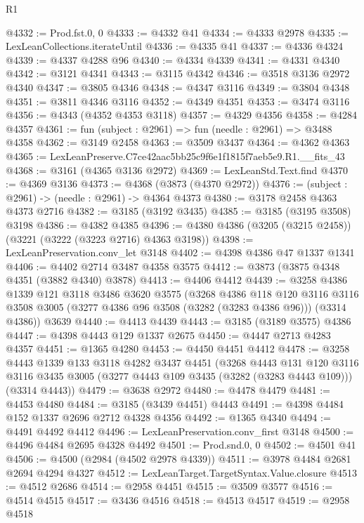 \begin{lexlean}{R1}
\begin{coremodule}
@4332 := Prod.fst.{0, 0}
@4333 := @4332 @41
@4334 := @4333 @2978
@4335 := LexLeanCollections.iterateUntil
@4336 := @4335 @41
@4337 := @4336 @4324
@4339 := @4337 @4288 @96
@4340 := @4334 @4339
@4341 := @4331 @4340
@4342 := @3121 @4341
@4343 := @3115 @4342
@4346 := @3518 @3136 @2972 @4340
@4347 := @3805 @4346
@4348 := @4347 @3116
@4349 := @3804 @4348
@4351 := @3811 @4346 @3116
@4352 := @4349 @4351
@4353 := @3474 @3116
@4356 := @4343 (@4352 @4353 @3118)
@4357 := @4329 @4356
@4358 := @4284 @4357
@4361 := fun (subject : @2961) => fun (needle : @2961) => @3488 @4358
@4362 := @3149 @2458
@4363 := @3509 @3437
@4364 := @4362 @4363
@4365 := LexLeanPreserve.C7ce42aac5bb25c9f6e1f1815f7aeb5e9.R1.__fits_43
@4368 := @3161 (@4365 @3136 @2972)
@4369 := LexLeanStd.Text.find
@4370 := @4369 @3136
@4373 := @4368 (@3873 (@4370 @2972))
@4376 := (subject : @2961) -> (needle : @2961) -> @4364 @4373
@4380 := @3178 @2458 @4363 @4373 @2716
@4382 := @3185 (@3192 @3435)
@4385 := @3185 (@3195 @3508) @3198
@4386 := @4382 @4385
@4396 := @4380 @4386 (@3205 (@3215 @2458)) (@3221 (@3222 (@3223 @2716) @4363 @3198))
@4398 := LexLeanPreservation.conv_let @3148
@4402 := @4398 @4386 @47 @1337 @1341
@4406 := @4402 @2714 @3487 @4358 @3575
@4412 := @3873 (@3875 @4348 @4351 (@3882 @4340) @3878)
@4413 := @4406 @4412
@4439 := @3258
    @4386
    @1339
    @121
    @3118
    @3486
    @3620
    @3575
    (@3268
      @4386
      @118
      @120
      @3116
      @3116
      @3508
      @3005
      (@3277 @4386 @96 @3508 (@3282 (@3283 @4386 @96)))
      (@3314 @4386))
    @3639
@4440 := @4413 @4439
@4443 := @3185 (@3189 @3575) @4386
@4447 := @4398 @4443 @129 @1337 @2675
@4450 := @4447 @2713 @4283 @4357
@4451 := @1365 @4280
@4453 := @4450 @4451 @4412
@4478 := @3258
    @4443
    @1339
    @133
    @3118
    @4282
    @3437
    @4451
    (@3268
      @4443
      @131
      @120
      @3116
      @3116
      @3435
      @3005
      (@3277 @4443 @109 @3435 (@3282 (@3283 @4443 @109)))
      (@3314 @4443))
@4479 := @3638 @2972
@4480 := @4478 @4479
@4481 := @4453 @4480
@4484 := @3185 (@3439 @4451) @4443
@4491 := @4398 @4484 @152 @1337 @2696 @2712 @4328 @4356
@4492 := @1365 @4340
@4494 := @4491 @4492 @4412
@4496 := LexLeanPreservation.conv_first @3148
@4500 := @4496 @4484 @2695 @4328 @4492
@4501 := Prod.snd.{0, 0}
@4502 := @4501 @41
@4506 := @4500 (@2984 (@4502 @2978 @4339))
@4511 := @3978 @4484 @2681 @2694 @4294 @4327
@4512 := LexLeanTarget.TargetSyntax.Value.closure
@4513 := @4512 @2686
@4514 := @2958 @4451
@4515 := @3509 @3577
@4516 := @4514 @4515
@4517 := @3436 @4516
@4518 := @4513 @4517
@4519 := @2958 @4518

\end{coremodule}
\end{lexlean}
